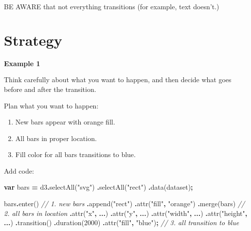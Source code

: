 \documentclass[
  openany]{book}
\newenvironment{Shaded}{\begin{snugshade}}{\end{snugshade}}
\newcommand{\CommentTok}[1]{\textcolor[rgb]{0.56,0.35,0.01}{\textit{#1}}}
\newcommand{\DecValTok}[1]{\textcolor[rgb]{0.00,0.00,0.81}{#1}}
\newcommand{\FunctionTok}[1]{\textcolor[rgb]{0.00,0.00,0.00}{#1}}
\newcommand{\KeywordTok}[1]{\textcolor[rgb]{0.13,0.29,0.53}{\textbf{#1}}}
\newcommand{\NormalTok}[1]{#1}
\newcommand{\OperatorTok}[1]{\textcolor[rgb]{0.81,0.36,0.00}{\textbf{#1}}}
\newcommand{\StringTok}[1]{\textcolor[rgb]{0.31,0.60,0.02}{#1}}
\begin{document}
BE AWARE that not everything transitions (for example, text doesn't.)

\hypertarget{strategy}{%
\section{Strategy}\label{strategy}}

\textbf{Example 1}

Think carefully about what you want to happen, and then decide what goes before and after the transition.

Plan what you want to happen:

\begin{enumerate}
\def\labelenumi{\arabic{enumi}.}
\item
  New bars appear with orange fill.
\item
  All bars in proper location.
\item
  Fill color for all bars transitions to blue.
\end{enumerate}

Add code:

\begin{Shaded}
\begin{Highlighting}[]

\KeywordTok{var}\NormalTok{ bars }\OperatorTok{=}\NormalTok{ d3}\OperatorTok{.}\FunctionTok{selectAll}\NormalTok{(}\StringTok{"svg"}\NormalTok{)}
  \OperatorTok{.}\FunctionTok{selectAll}\NormalTok{(}\StringTok{"rect"}\NormalTok{)}
  \OperatorTok{.}\FunctionTok{data}\NormalTok{(dataset)}\OperatorTok{;}
  
\NormalTok{bars}\OperatorTok{.}\FunctionTok{enter}\NormalTok{()                  }\CommentTok{// 1. new bars}
  \OperatorTok{.}\FunctionTok{append}\NormalTok{(}\StringTok{"rect"}\NormalTok{)}
    \OperatorTok{.}\FunctionTok{attr}\NormalTok{(}\StringTok{"fill"}\OperatorTok{,} \StringTok{"orange"}\NormalTok{)}
  \OperatorTok{.}\FunctionTok{merge}\NormalTok{(bars)                }\CommentTok{// 2. all bars in location}
    \OperatorTok{.}\FunctionTok{attr}\NormalTok{(}\StringTok{"x"}\OperatorTok{,} \OperatorTok{...}\NormalTok{)}
    \OperatorTok{.}\FunctionTok{attr}\NormalTok{(}\StringTok{"y"}\OperatorTok{,} \OperatorTok{...}\NormalTok{)}
    \OperatorTok{.}\FunctionTok{attr}\NormalTok{(}\StringTok{"width"}\OperatorTok{,} \OperatorTok{...}\NormalTok{)}
    \OperatorTok{.}\FunctionTok{attr}\NormalTok{(}\StringTok{"height"}\OperatorTok{,} \OperatorTok{...}\NormalTok{)}
  \OperatorTok{.}\FunctionTok{transition}\NormalTok{()}
  \OperatorTok{.}\FunctionTok{duration}\NormalTok{(}\DecValTok{2000}\NormalTok{)}
    \OperatorTok{.}\FunctionTok{attr}\NormalTok{(}\StringTok{"fill"}\OperatorTok{,} \StringTok{"blue"}\NormalTok{)}\OperatorTok{;}   \CommentTok{// 3. all transition to blue}
\end{Highlighting}
\end{Shaded}
\end{document}
